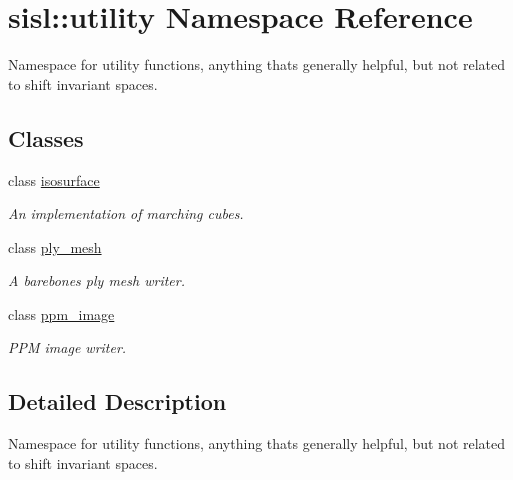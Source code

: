 \hypertarget{namespacesisl_1_1utility}{}\section{sisl\+:\+:utility Namespace Reference}
\label{namespacesisl_1_1utility}


Namespace for utility functions, anything that\textquotesingle{}s generally helpful, but not related to shift invariant spaces.  


\subsection*{Classes}
\begin{DoxyCompactItemize}
\item 
class \hyperlink{classsisl_1_1utility_1_1isosurface}{isosurface}
\begin{DoxyCompactList}\small\item\em An implementation of marching cubes. \end{DoxyCompactList}\item 
class \hyperlink{classsisl_1_1utility_1_1ply__mesh}{ply\+\_\+mesh}
\begin{DoxyCompactList}\small\item\em A barebones ply mesh writer. \end{DoxyCompactList}\item 
class \hyperlink{classsisl_1_1utility_1_1ppm__image}{ppm\+\_\+image}
\begin{DoxyCompactList}\small\item\em P\+PM image writer. \end{DoxyCompactList}\end{DoxyCompactItemize}


\subsection{Detailed Description}
Namespace for utility functions, anything that\textquotesingle{}s generally helpful, but not related to shift invariant spaces. 
